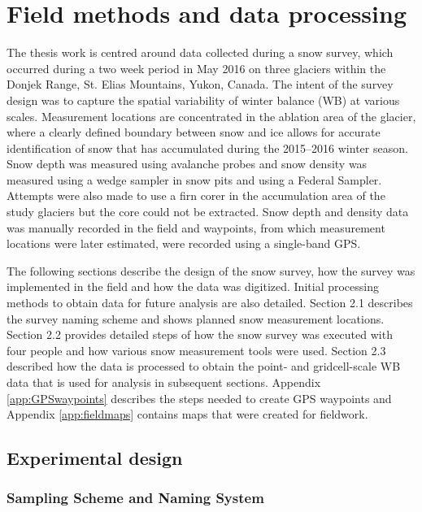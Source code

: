 \documentclass{sfuthesis}
\begin{document}

\chapter{Field methods and data processing}

The thesis work is centred around data collected during a snow survey, which occurred during a two week period in May 2016 on three glaciers within the Donjek Range, St. Elias Mountains, Yukon, Canada. The intent of the survey design was to capture the spatial variability of winter balance (WB) at various scales. Measurement locations are concentrated in the ablation area of the glacier, where a clearly defined boundary between snow and ice allows for accurate identification of snow that has accumulated during the 2015--2016 winter season. Snow depth was measured using avalanche probes and snow density was measured using a wedge sampler in snow pits and using a Federal Sampler. Attempts were also made to use a firn corer in the accumulation area of the study glaciers but the core could not be extracted. Snow depth and density data was manually recorded in the field and waypoints, from which measurement locations were later estimated, were recorded using a single-band GPS. 

The following sections describe the design of the snow survey, how the survey was implemented in the field and how the data was digitized. Initial processing methods to obtain data for future analysis are also detailed. Section 2.1 describes the survey naming scheme and shows planned snow measurement locations. Section 2.2 provides detailed steps of how  the snow survey was executed with four people and how various snow measurement tools were used. Section 2.3 described how the data is processed to obtain the point- and gridcell-scale WB data that is used for analysis in subsequent sections. Appendix \ref{app:GPSwaypoints} describes the steps needed to create GPS waypoints and Appendix \ref{app:fieldmaps} contains maps that were created for fieldwork.

\section{Experimental design}
\label{sec:FieldDesign}

\subsection{Sampling Scheme and Naming System}
\end{document}
